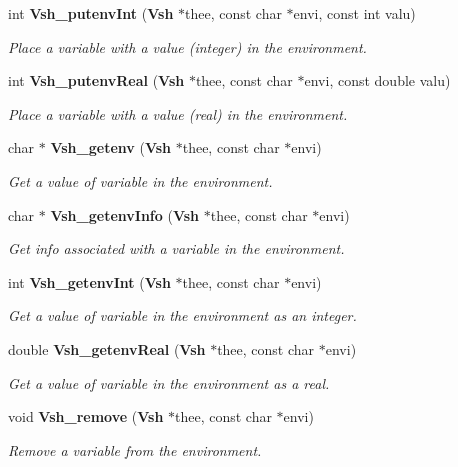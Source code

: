 \begin{DoxyCompactItemize}
int {\bf Vsh\_\-putenvInt} ({\bf Vsh} $\ast$thee, const char $\ast$envi, const int valu)
\begin{DoxyCompactList}\small\item\em Place a variable with a value (integer) in the environment. \item\end{DoxyCompactList}\item 
int {\bf Vsh\_\-putenvReal} ({\bf Vsh} $\ast$thee, const char $\ast$envi, const double valu)
\begin{DoxyCompactList}\small\item\em Place a variable with a value (real) in the environment. \item\end{DoxyCompactList}\item 
char $\ast$ {\bf Vsh\_\-getenv} ({\bf Vsh} $\ast$thee, const char $\ast$envi)
\begin{DoxyCompactList}\small\item\em Get a value of variable in the environment. \item\end{DoxyCompactList}\item 
char $\ast$ {\bf Vsh\_\-getenvInfo} ({\bf Vsh} $\ast$thee, const char $\ast$envi)
\begin{DoxyCompactList}\small\item\em Get info associated with a variable in the environment. \item\end{DoxyCompactList}\item 
int {\bf Vsh\_\-getenvInt} ({\bf Vsh} $\ast$thee, const char $\ast$envi)
\begin{DoxyCompactList}\small\item\em Get a value of variable in the environment as an integer. \item\end{DoxyCompactList}\item 
double {\bf Vsh\_\-getenvReal} ({\bf Vsh} $\ast$thee, const char $\ast$envi)
\begin{DoxyCompactList}\small\item\em Get a value of variable in the environment as a real. \item\end{DoxyCompactList}\item 
void {\bf Vsh\_\-remove} ({\bf Vsh} $\ast$thee, const char $\ast$envi)
\begin{DoxyCompactList}\small\item\em Remove a variable from the environment. \item\end{DoxyCompactList}\item 

\end{DoxyCompactItemize}
